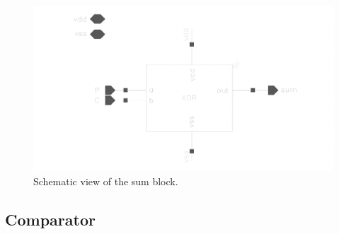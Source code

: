 \begin{figure}[H]
  \centering
  \captionsetup{justification=centering}
  \includegraphics[clip,width=1.0\textwidth]{../figures/sum}
  \caption{Schematic view of the sum block.} \label{fig:sum}
\end{figure}

\subsection{Comparator}

